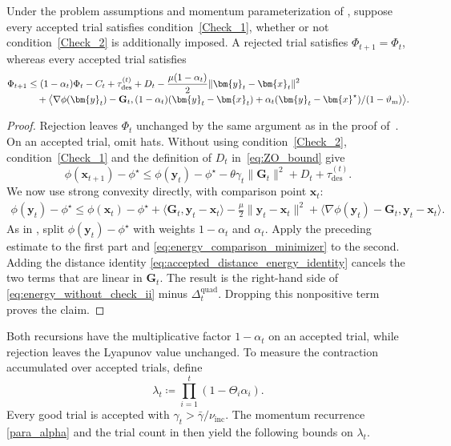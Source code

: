 \documentclass{article}
\begin{document}
\begin{corollary}
\label{cor:energy_without_check_ii} 
Under the problem assumptions and momentum parameterization of
, suppose every accepted trial satisfies
condition~\eqref{Check_1}, whether or not condition~\eqref{Check_2}
is additionally imposed. A rejected trial
satisfies \(\Phi_{t+1}=\Phi_t\), whereas every accepted trial satisfies
\begin{align}
\Phi_{t+1}
&\le
(1-\alpha_t)\Phi_t-C_t
+\tau_{\mathrm{des}}^{(t)}+D_t-\frac{\mu(1-\alpha_t)}{2}\|\bm{y}_t-\bm{x}_t\|^2
\notag\\[-1mm]
&\quad
+\big\langle
\nabla\phi(\bm{y}_t)-\mathbf{G}_t,
(1-\alpha_t)(\bm{y}_t-\bm{x}_t)
+{\alpha_t}(\bm{y}_t-\bm{x}^\star)/({1-\vartheta_{\mathrm{m}}})
\big\rangle.
\label{eq:energy_without_check_ii}
\end{align}
\end{corollary}
\begin{proof}Rejection leaves $\Phi_t$ unchanged by the same argument as in the proof of~. On an accepted trial, omit hats. Without using condition~\eqref{Check_2}, condition~\eqref{Check_1} and the definition of \(D_t\) in~\eqref{eq:ZO_bound} give
\[
\phi(\bm{x}_{t+1})-\phi^\star
\le
\phi(\bm{y}_t)-\phi^\star
-\theta\gamma_t\|\mathbf{G}_t\|^2
+D_t+\tau_{\mathrm{des}}^{(t)}.
\]
We now use strong convexity directly, with comparison point $\bm{x}_t$:
\[
\begin{aligned}
\phi(\bm{y}_t)-\phi^\star
\le\phi(\bm{x}_t)-\phi^\star+\langle\mathbf{G}_t,\bm{y}_t-\bm{x}_t\rangle
-\frac\mu2\|\bm{y}_t-\bm{x}_t\|^2+\langle\nabla\phi(\bm{y}_t)-\mathbf{G}_t,\bm{y}_t-\bm{x}_t\rangle.
\end{aligned}
\]
As in , split $\phi(\bm{y}_t)-\phi^\star$ with weights $1-\alpha_t$ and $\alpha_t$. Apply the preceding estimate to the first part and \eqref{eq:energy_comparison_minimizer} to the second. Adding the distance identity \eqref{eq:accepted_distance_energy_identity} cancels the two terms that are linear in $\mathbf{G}_t$. The result is the right-hand side of \eqref{eq:energy_without_check_ii} minus $\Delta_t^{\mathrm{quad}}$. Dropping this nonpositive term proves the claim.
\end{proof}

Both recursions have the multiplicative factor $1-\alpha_t$ on an accepted trial, while rejection leaves the Lyapunov value unchanged. To measure the contraction accumulated over accepted trials, define
\begin{equation}\label{dfn_lambda_t}
 \lambda_t
\coloneqq 
\textstyle\prod_{i=1}^t(1-\Theta_i\alpha_i).
\end{equation}
Every good trial is accepted with $\gamma_t>\bar\gamma/\nu_{\mathrm{inc}}$. The momentum recurrence \eqref{para_alpha} and the trial count in  then yield the following bounds on $\lambda_t$.
\end{document}

